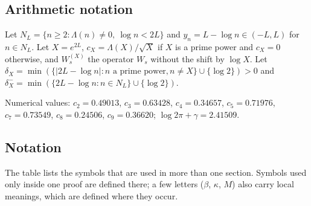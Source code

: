 \documentclass[11pt]{amsart}
\theoremstyle{definition}
\theoremstyle{remark}
\numberwithin{equation}{section}
\begin{document}
\subsection{Arithmetic notation}\label{sec:arith}
Let $N_L=\{n\ge2:\Lambda(n)\ne0,\ \log n<2L\}$ and $y_n=L-\log n\in(-L,L)$ for $n\in N_L$. Let $X=e^{2L}$, $c_X=\Lambda(X)/\sqrt X$ if $X$ is a prime power and $c_X=0$ otherwise, and $W^{(X)}_s$ the operator $W_s$ without the shift by $\log X$. Let $\delta_X=\min(\{|2L-\log n|:n\text{ a prime power},n\ne X\}\cup\{\log2\})>0$ and $\delta^-_X=\min(\{2L-\log n:n\in N_L\}\cup\{\log2\})$.

Numerical values: $c_2=0.49013$, $c_3=0.63428$, $c_4=0.34657$, $c_5=0.71976$, $c_7=0.73549$, $c_8=0.24506$, $c_9=0.36620$; $\log2\pi+\gamma=2.41509$.

\subsection{Notation}\label{sec:notation}
The table lists the symbols that are used in more than one section. Symbols used only inside one proof are defined there; a few letters ($\beta$, $\kappa$, $M$) also carry local meanings, which are defined where they occur.
\end{document}
